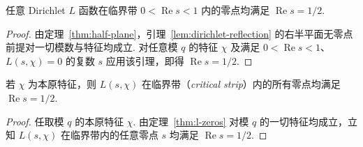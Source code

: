 \begin{theorem}
\label{thm:l-zeros}
\emitthmsource
任意 Dirichlet $L$ 函数在临界带 $0<\operatorname{Re}s<1$ 内的零点均满足 $\operatorname{Re}s=1/2$.
\end{theorem}
\begin{proof}
由定理~\ref{thm:half-plane}，引理~\ref{lem:dirichlet-reflection} 的右半平面无零点前提对一切模数与特征均成立. 对任意模 $q$ 的特征 $\chi$ 及满足 $0<\operatorname{Re}s<1$、$L(s,\chi)=0$ 的复数 $s$ 应用该引理，即得 $\operatorname{Re}s=1/2$.
\end{proof}

\begin{theorem}
\label{thm:primitive}
\emitthmsource
若 $\chi$ 为本原特征，则 $L(s,\chi)$ 在临界带（\emph{critical strip}）内的所有零点均满足 $\operatorname{Re}s=1/2$.
\end{theorem}
\begin{proof}
任取模 $q$ 的本原特征 $\chi$. 由定理~\ref{thm:l-zeros} 对模 $q$ 的一切特征均成立，立知 $L(s,\chi)$ 在临界带内的任意零点 $s$ 均满足 $\operatorname{Re}s=1/2$.
\end{proof}
